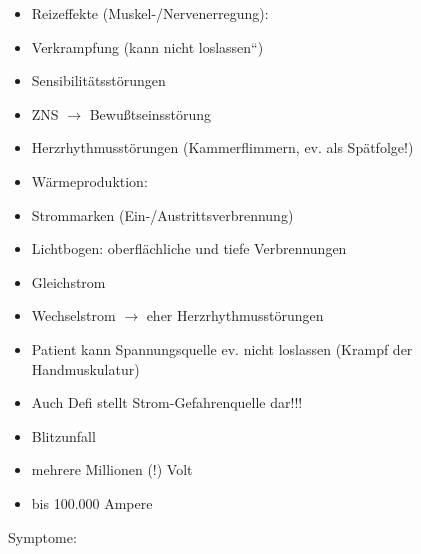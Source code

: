 \documentclass{article}
\begin{document}
\begin{itemize}
\item Reizeffekte (Muskel-/Nervenerregung):

\end{itemize}
\begin{itemize}
\item Verkrampfung ({\quotedblbase}kann nicht
loslassen{\textquotedblleft})

\item Sensibilit\"atsst\"orungen

\item ZNS ${\rightarrow}$ Bewu{\ss}tseinsst\"orung

\item Herzrhythmusst\"orungen (Kammerflimmern, ev.  als Sp\"atfolge!)

\end{itemize}
\begin{itemize}
\item W\"armeproduktion:

\end{itemize}
\begin{itemize}
\item Strommarken (Ein-/Austrittsverbrennung)

\item Lichtbogen: oberfl\"achliche und tiefe  Verbrennungen

\end{itemize}
\begin{itemize}
\item Gleichstrom

\item Wechselstrom ${\rightarrow}$ eher  Herzrhythmusst\"orungen

\item Patient  kann Spannungsquelle ev. nicht  loslassen (Krampf der
Handmuskulatur)

\item Auch Defi stellt Strom-Gefahrenquelle  dar!!!

\item Blitzunfall

\end{itemize}
\begin{itemize}
\item mehrere Millionen (!) Volt

\item bis 100.000 Ampere

\end{itemize}
Symptome:
\end{document}
